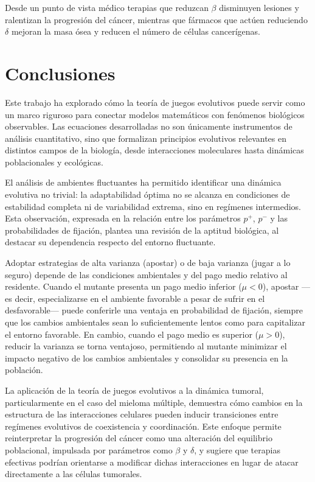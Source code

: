 \documentclass[%
 sor,
 jor,
 amsmath,amssymb,
 reprint,%
]{revtex4-2}
\begin{document}
Desde un punto de vista médico terapias que reduzcan $\beta$ disminuyen lesiones y ralentizan la progresión del cáncer, mientras que fármacos que actúen reduciendo $\delta$ mejoran la masa ósea y reducen el número de células cancerígenas.










\section{Conclusiones}




Este trabajo ha explorado cómo la teoría de juegos evolutivos puede servir como un marco riguroso para conectar modelos matemáticos con fenómenos biológicos observables. Las ecuaciones desarrolladas no son únicamente instrumentos de análisis cuantitativo, sino que formalizan principios evolutivos relevantes en distintos campos de la biología, desde interacciones moleculares hasta dinámicas poblacionales y ecológicas.

El análisis de ambientes fluctuantes ha permitido identificar una dinámica evolutiva no trivial: la adaptabilidad óptima no se alcanza en condiciones de estabilidad completa ni de variabilidad extrema, sino en regímenes intermedios. Esta observación, expresada en la relación entre los parámetros $p^+$, $p^-$ y las probabilidades de fijación, plantea una revisión de la aptitud biológica, al destacar su dependencia respecto del entorno fluctuante.

Adoptar estrategias de alta varianza (apostar) o de baja varianza (jugar a lo seguro) depende de las condiciones ambientales y del pago medio relativo al residente. Cuando el mutante presenta un pago medio inferior (\(\mu < 0\)), apostar —es decir, especializarse en el ambiente favorable a pesar de sufrir en el desfavorable— puede conferirle una ventaja en probabilidad de fijación, siempre que los cambios ambientales sean lo suficientemente lentos como para capitalizar el entorno favorable. En cambio, cuando el pago medio es superior (\(\mu > 0\)), reducir la varianza se torna ventajoso, permitiendo al mutante minimizar el impacto negativo de los cambios ambientales y consolidar su presencia en la población.


La aplicación de la teoría de juegos evolutivos a la dinámica tumoral, particularmente en el caso del mieloma múltiple, demuestra cómo cambios en la estructura de las interacciones celulares pueden inducir transiciones entre regímenes evolutivos de coexistencia y coordinación. Este enfoque permite reinterpretar la progresión del cáncer como una alteración del equilibrio poblacional, impulsada por parámetros como $\beta$ y $\delta$, y sugiere que terapias efectivas podrían orientarse a modificar dichas interacciones en lugar de atacar directamente a las células tumorales.
\end{document}

